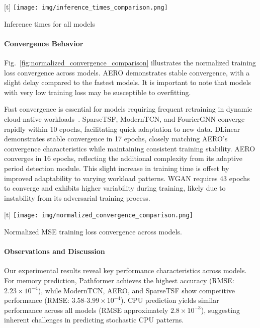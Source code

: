 \documentclass{ieeetmlcn}
\begin{document}
\par\medskip\begin{center}[t]
\centering
\texttt{[image: img/inference\_times\_comparison.png]}
\caption{Inference times for all models}
\label{fig:inference_times}\end{center}\medskip\par

\paragraph*{Convergence Behavior}

Fig.~\ref{fig:normalized_convergence_comparison} illustrates the normalized training loss convergence across models. AERO demonstrates stable convergence, with a slight delay compared to the fastest models. It is important to note that models with very low training loss may be susceptible to overfitting.

Fast convergence is essential for models requiring frequent retraining in dynamic cloud-native workloads~\cite{gudepu2023adaptive}. SparseTSF, ModernTCN, and FourierGNN converge rapidly within 10 epochs, facilitating quick adaptation to new data. {\color{blue} DLinear demonstrates stable convergence in 17 epochs, closely matching AERO's convergence characteristics while maintaining consistent training stability.} AERO converges in 16 epochs, reflecting the additional complexity from its adaptive period detection module. This slight increase in training time is offset by improved adaptability to varying workload patterns. WGAN requires 43 epochs to converge and exhibits higher variability during training, likely due to instability from its adversarial training process.

\par\medskip\begin{center}[t]
\centering
\texttt{[image: img/normalized\_convergence\_comparison.png]}
\caption{Normalized MSE training loss convergence across models.}
\label{fig:normalized_convergence_comparison}\end{center}\medskip\par

\paragraph*{Observations and Discussion}

Our experimental results reveal key performance characteristics across models. For memory prediction, Pathformer achieves the highest accuracy (RMSE: $2.23 \times 10^{-4}$), while ModernTCN, AERO, and SparseTSF show competitive performance (RMSE: $3.58$-$3.99 \times 10^{-4}$). CPU prediction yields similar performance across all models (RMSE approximately $2.8 \times 10^{-3}$), suggesting inherent challenges in predicting stochastic CPU patterns.
\end{document}
